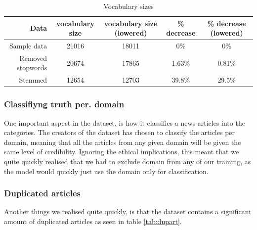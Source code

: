 \begin{table}[h]
    \centering
    \begin{tabular}{r| c | c | c| c}
      Data& vocabulary size & vocabulary size (lowered) & \% decrease & \% decrease (lowered)\\
        \hline
      Sample data& 21016 & 18011 & 0\% & 0\% \\
    \hline
      Removed stopwords & 20674 & 17865 & 1.63\% & 0.81\% \\
    \hline
      Stemmed & 12654 & 12703 & 39.8\% & 29.5\%
    \end{tabular}
    \caption{Vocabulary sizes}
    \label{tab:vocab_sizes}
\end{table}



\subsubsection{Classifiyng truth per. domain}\label{sec:truth_pr_domain}
One important aspect in the dataset, is how it classifies a news articles into the categories. The creators of the
dataset has chosen to classify the articles per domain, meaning that all the articles from any given domain will be
given the same level of credibility. Ignoring the ethical implications, this meant that we quite quickly realised that
we had to exclude domain from any of our training, as the model would quickly just use the domain only for
classification.
\subsubsection{Duplicated articles}\label{sec:dup_articles}
Another things we realised quite quickly, is that the dataset contains a significant amount of duplicated articles as
seen in table \ref{tab:dupart}.

